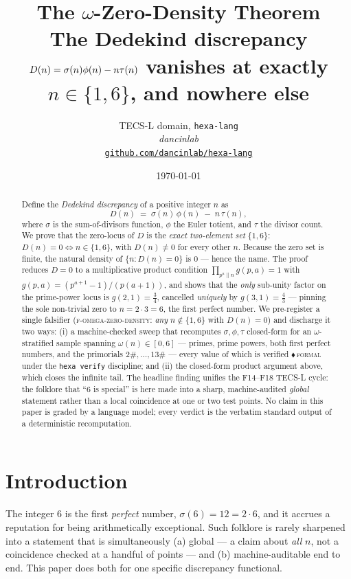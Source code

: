 \documentclass[11pt,a4paper]{article}
\title{
  \textbf{The \texorpdfstring{$\omega$}{omega}-Zero-Density Theorem}\\[4pt]
  \large The Dedekind discrepancy \texorpdfstring{$D(n)=\sig(n)\phi(n)-n\tau(n)$}{D(n)=sigma phi - n tau}
  vanishes at exactly \texorpdfstring{$n\in\{1,6\}$}{n in \{1,6\}}, and nowhere else
}
\author{
  TECS-L domain, \texttt{hexa-lang}\\
  \normalsize\textit{dancinlab}\\[2pt]
  \normalsize\href{https://github.com/dancinlab/hexa-lang}{\texttt{github.com/dancinlab/hexa-lang}}
}
\date{\today}
\newcommand{\sig}{\sigma}
\newcommand{\formal}{\textcolor{blue!60!black}{$\blacklozenge$}}
\theoremstyle{plain}
\theoremstyle{definition}
\begin{document}
\maketitle

\begin{abstract}
Define the \emph{Dedekind discrepancy} of a positive integer $n$ as
\[
  D(n) \;=\; \sig(n)\,\phi(n) \;-\; n\,\tau(n),
\]
where $\sig$ is the sum-of-divisors function, $\phi$ the Euler totient, and
$\tau$ the divisor count. We prove that the zero-locus of $D$ is the
\emph{exact two-element set} $\{1,6\}$: $D(n)=0 \iff n\in\{1,6\}$, with
$D(n)\neq 0$ for every other $n$. Because the zero set is finite, the natural
density of $\{n : D(n)=0\}$ is $0$ --- hence the name. The proof reduces $D=0$
to a multiplicative product condition $\prod_{p^a\|n} g(p,a)=1$ with
$g(p,a)=(p^{a+1}-1)/(p(a+1))$, and shows that the \emph{only} sub-unity factor
on the prime-power locus is $g(2,1)=\tfrac34$, cancelled \emph{uniquely} by
$g(3,1)=\tfrac43$ --- pinning the sole non-trivial zero to $n=2\cdot3=6$, the
first perfect number. We pre-register a single falsifier
(\textsc{f-omega-zero-density}: \emph{any} $n\notin\{1,6\}$ with $D(n)=0$) and
discharge it two ways: (i) a machine-checked sweep that recomputes $\sig,\phi,
\tau$ closed-form for an $\omega$-stratified sample spanning $\omega(n)\in[0,6]$
--- primes, prime powers, both first perfect numbers, and the primorials
$2\#,\dots,13\#$ --- every value of which is verified
\formal\,\textsc{formal} under the \texttt{hexa verify} discipline; and (ii)
the closed-form product argument above, which closes the infinite tail. The
headline finding unifies the F14--F18 TECS-L cycle: the folklore that ``$6$ is
special'' is here made into a sharp, machine-audited \emph{global} statement
rather than a local coincidence at one or two test points. No claim in this
paper is graded by a language model; every verdict is the verbatim standard
output of a deterministic recomputation.
\end{abstract}

\section{Introduction}
\label{sec:intro}

The integer $6$ is the first \emph{perfect} number, $\sig(6)=12=2\cdot6$, and
it accrues a reputation for being arithmetically exceptional. Such folklore is
rarely sharpened into a statement that is simultaneously (a) global --- a claim
about \emph{all} $n$, not a coincidence checked at a handful of points --- and
(b) machine-auditable end to end. This paper does both for one specific
discrepancy functional.
\end{document}
